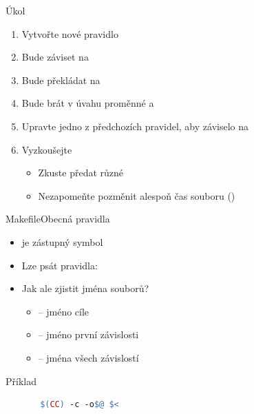 \begin{frame}{Úkol}

  \begin{enumerate}
    \item Vytvořte nové pravidlo 
    \item Bude záviset na 
    \item Bude překládat  na 
    \item Bude brát v úvahu proměnné  a 
    \item Upravte jedno z předchozích  pravidel, aby záviselo na
    \item Vyzkoušejte
    \begin{itemize}
      \item Zkuste předat různé 
      \item Nezapomeňte pozměnit alespoň čas souboru ()
    \end{itemize}
  \end{enumerate}

\end{frame}

\begin{frame}[fragile]{Makefile}{Obecná pravidla}

  \begin{itemize}
    \item \code{\%} je zástupný symbol
    \item Lze psát pravidla: 

    \pause

    \item Jak ale zjistit jména souborů?
    \begin{itemize}
      \item {} -- jméno cíle
      \item \code{\$<} -- jméno první závislosti
      \item \code{\$^} -- jména všech závislostí
    \end{itemize}
  \end{itemize}

  \pause

  \begin{block}{Příklad}
  \begin{lstlisting}[language=make]
%.o: %.c
       $(CC) -c -o$@ $<
  \end{lstlisting} %
  \end{block}

\end{frame}

